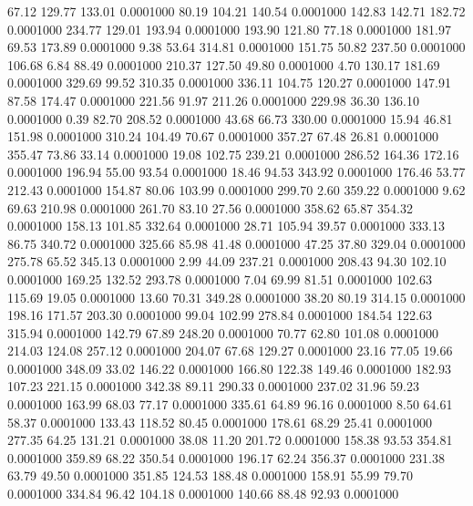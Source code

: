  67.12  129.77  133.01   0.0001000
  80.19  104.21  140.54   0.0001000
 142.83  142.71  182.72   0.0001000
 234.77  129.01  193.94   0.0001000
 193.90  121.80   77.18   0.0001000
 181.97   69.53  173.89   0.0001000
   9.38   53.64  314.81   0.0001000
 151.75   50.82  237.50   0.0001000
 106.68    6.84   88.49   0.0001000
 210.37  127.50   49.80   0.0001000
   4.70  130.17  181.69   0.0001000
 329.69   99.52  310.35   0.0001000
 336.11  104.75  120.27   0.0001000
 147.91   87.58  174.47   0.0001000
 221.56   91.97  211.26   0.0001000
 229.98   36.30  136.10   0.0001000
   0.39   82.70  208.52   0.0001000
  43.68   66.73  330.00   0.0001000
  15.94   46.81  151.98   0.0001000
 310.24  104.49   70.67   0.0001000
 357.27   67.48   26.81   0.0001000
 355.47   73.86   33.14   0.0001000
  19.08  102.75  239.21   0.0001000
 286.52  164.36  172.16   0.0001000
 196.94   55.00   93.54   0.0001000
  18.46   94.53  343.92   0.0001000
 176.46   53.77  212.43   0.0001000
 154.87   80.06  103.99   0.0001000
 299.70    2.60  359.22   0.0001000
   9.62   69.63  210.98   0.0001000
 261.70   83.10   27.56   0.0001000
 358.62   65.87  354.32   0.0001000
 158.13  101.85  332.64   0.0001000
  28.71  105.94   39.57   0.0001000
 333.13   86.75  340.72   0.0001000
 325.66   85.98   41.48   0.0001000
  47.25   37.80  329.04   0.0001000
 275.78   65.52  345.13   0.0001000
   2.99   44.09  237.21   0.0001000
 208.43   94.30  102.10   0.0001000
 169.25  132.52  293.78   0.0001000
   7.04   69.99   81.51   0.0001000
 102.63  115.69   19.05   0.0001000
  13.60   70.31  349.28   0.0001000
  38.20   80.19  314.15   0.0001000
 198.16  171.57  203.30   0.0001000
  99.04  102.99  278.84   0.0001000
 184.54  122.63  315.94   0.0001000
 142.79   67.89  248.20   0.0001000
  70.77   62.80  101.08   0.0001000
 214.03  124.08  257.12   0.0001000
 204.07   67.68  129.27   0.0001000
  23.16   77.05   19.66   0.0001000
 348.09   33.02  146.22   0.0001000
 166.80  122.38  149.46   0.0001000
 182.93  107.23  221.15   0.0001000
 342.38   89.11  290.33   0.0001000
 237.02   31.96   59.23   0.0001000
 163.99   68.03   77.17   0.0001000
 335.61   64.89   96.16   0.0001000
   8.50   64.61   58.37   0.0001000
 133.43  118.52   80.45   0.0001000
 178.61   68.29   25.41   0.0001000
 277.35   64.25  131.21   0.0001000
  38.08   11.20  201.72   0.0001000
 158.38   93.53  354.81   0.0001000
 359.89   68.22  350.54   0.0001000
 196.17   62.24  356.37   0.0001000
 231.38   63.79   49.50   0.0001000
 351.85  124.53  188.48   0.0001000
 158.91   55.99   79.70   0.0001000
 334.84   96.42  104.18   0.0001000
 140.66   88.48   92.93   0.0001000
